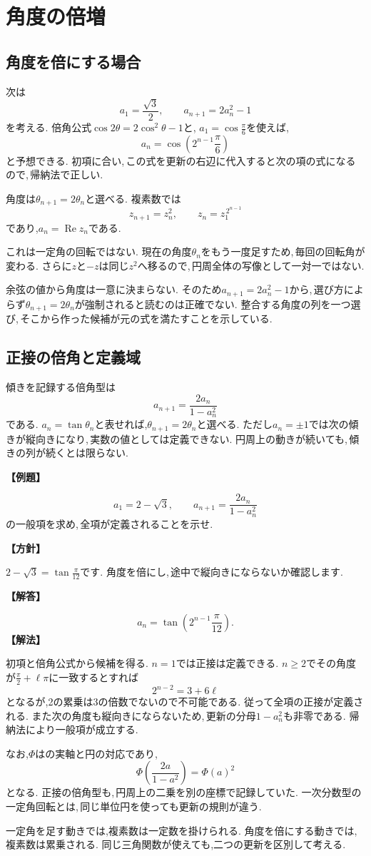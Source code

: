 \section{角度の倍増}\label{節：角度の倍増}
\subsection{角度を倍にする場合}

次は
\[
 a_1=\frac{\sqrt3}{2},\qquad a_{n+1}=2a_n^2-1
\]
を考える.
倍角公式$\cos2\theta=2\cos^2\theta-1$と,
$a_1=\cos\frac{\pi}{6}$を使えば,
\[
 a_n=\cos\left(2^{n-1}\frac{\pi}{6}\right)
\]
と予想できる.
初項に合い,\,この式を更新の右辺に代入すると次の項の式になるので,\,帰納法で正しい.

角度は$\theta_{n+1}=2\theta_n$と選べる.
複素数では
\[
 z_{n+1}=z_n^2,\qquad z_n=z_1^{\,2^{n-1}}
\]
であり,$a_n=\operatorname{Re}z_n$である.
\NewFigDoubling

これは一定角の回転ではない.
現在の角度$\theta_n$をもう一度足すため,\,毎回の回転角が変わる.
さらに$z$と$-z$は同じ$z^2$へ移るので,\,円周全体の写像として一対一ではない.

余弦の値から角度は一意に決まらない.
そのため$a_{n+1}=2a_n^2-1$から,\,選び方によらず$\theta_{n+1}=2\theta_n$が強制されると読むのは正確でない.
整合する角度の列を一つ選び,\,そこから作った候補が元の式を満たすことを示している.

\subsection{正接の倍角と定義域}

傾きを記録する倍角型は
\[
 a_{n+1}=\frac{2a_n}{1-a_n^2}
\]
である.
$a_n=\tan\theta_n$と表せれば,$\theta_{n+1}=2\theta_n$と選べる.
ただし$a_n=\pm1$では次の傾きが縦向きになり,\,実数の値としては定義できない.
円周上の動きが続いても,\,傾きの列が続くとは限らない.

\noindent\textbf{【例題】}\par\nobreak
\[
 a_1=2-\sqrt3,\qquad
 a_{n+1}=\frac{2a_n}{1-a_n^2}
\]
の一般項を求め,\,全項が定義されることを示せ.

\noindent\textbf{【方針】}\par\nobreak
$2-\sqrt3=\tan\frac{\pi}{12}$です. 角度を倍にし,\,途中で縦向きにならないか確認します.

\noindent\textbf{【解答】}\par\nobreak
\[
 a_n=\tan\left(2^{n-1}\frac{\pi}{12}\right).
\]
\noindent\textbf{【解法】}\par\nobreak
初項と倍角公式から候補を得る.
$n=1$では正接は定義できる.
$n\ge2$でその角度が$\frac{\pi}{2}+\ell\pi$に一致するとすれば
\[
 2^{n-2}=3+6\ell
\]
となるが,2の累乗は3の倍数でないので不可能である.
従って全項の正接が定義される.
また次の角度も縦向きにならないため,\,更新の分母$1-a_n^2$も非零である.
帰納法により一般項が成立する.

なお,$\Phi$はの実軸と円の対応であり,
\[
 \Phi\left(\frac{2a}{1-a^2}\right)=\Phi(a)^2
\]
となる.
正接の倍角型も,\,円周上の二乗を別の座標で記録していた.
一次分数型の一定角回転とは,\,同じ単位円を使っても更新の規則が違う.


\begin{bookpoint}
一定角を足す動きでは,複素数は一定数を掛けられる.
角度を倍にする動きでは,複素数は累乗される.
同じ三角関数が使えても,二つの更新を区別して考える.
\end{bookpoint}
